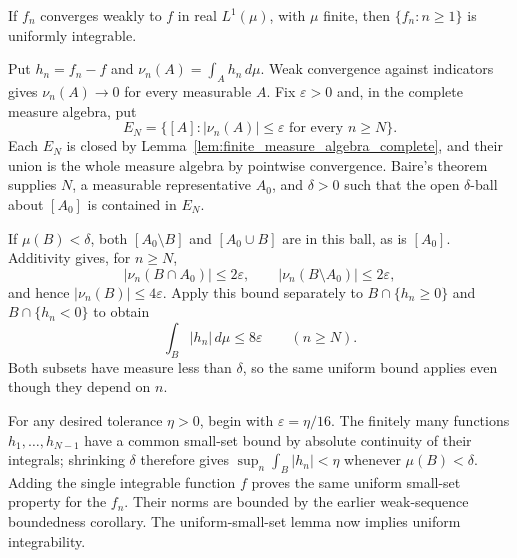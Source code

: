 \begin{theorem}
\label{thm:weak_sequence_UI}
If $f_n$ converges weakly to $f$ in real $L^1(\mu)$, with $\mu$ finite,
then $\{f_n:n\geq1\}$ is uniformly integrable.
\end{theorem}
\Proof
Put $h_n=f_n-f$ and $\nu_n(A)=\int_Ah_n\,d\mu$.
Weak convergence against indicators gives $\nu_n(A)\to0$ for every
measurable $A$. Fix $\varepsilon>0$ and, in the complete measure algebra,
put
\[
E_N=\{[A]:|\nu_n(A)|\leq\varepsilon
                  \text{ for every }n\geq N\}.
\]
Each $E_N$ is closed by Lemma~\ref{lem:finite_measure_algebra_complete},
and their union is the
whole measure algebra by pointwise convergence. Baire's theorem supplies
$N$, a measurable representative $A_0$, and $\delta>0$ such that the
open $\delta$-ball about $[A_0]$ is contained in $E_N$.

If $\mu(B)<\delta$, both $[A_0\setminus B]$ and $[A_0\cup B]$
are in this ball, as is $[A_0]$. Additivity gives, for $n\geq N$,
\[
|\nu_n(B\cap A_0)|\leq2\varepsilon,
\qquad |\nu_n(B\setminus A_0)|\leq2\varepsilon,
\]
and hence $|\nu_n(B)|\leq4\varepsilon$.
Apply this bound separately to
$B\cap\{h_n\geq0\}$ and $B\cap\{h_n<0\}$ to obtain
\[
\int_B|h_n|\,d\mu\leq8\varepsilon\qquad(n\geq N).
\]
Both subsets have measure less than $\delta$, so the same uniform bound
applies even though they depend on $n$.

For any desired tolerance $\eta>0$, begin with
$\varepsilon=\eta/16$. The finitely many functions $h_1,\ldots,h_{N-1}$
have a common small-set bound by absolute continuity of their integrals;
shrinking $\delta$ therefore gives
$\sup_n\int_B|h_n|<\eta$ whenever $\mu(B)<\delta$.
Adding the single integrable function $f$ proves the same uniform
small-set property for the $f_n$. Their norms are bounded by the earlier
weak-sequence boundedness corollary. The uniform-small-set lemma now
implies uniform integrability.
\Done

